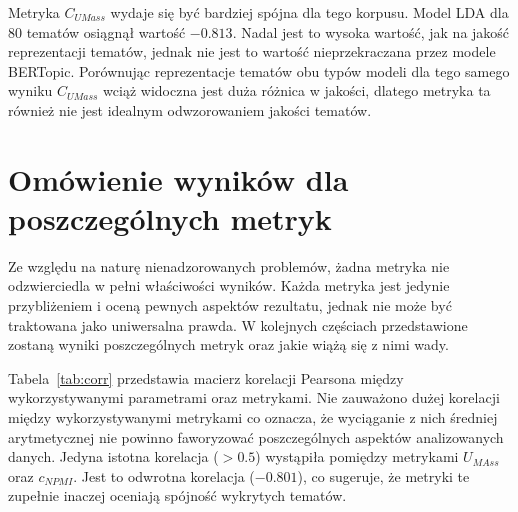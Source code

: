 	Metryka \(C_{UMass}\) wydaje się być bardziej spójna dla tego korpusu.
	Model LDA dla 80 tematów osiągnął wartość \(-0.813\).
	Nadal jest to wysoka wartość, jak na jakość reprezentacji tematów, jednak nie jest to wartość nieprzekraczana przez modele BERTopic.
	Porównując reprezentacje tematów obu typów modeli dla tego samego wyniku \(C_{UMass}\) wciąż widoczna jest duża różnica w jakości,
		dlatego metryka ta również nie jest idealnym odwzorowaniem jakości tematów.
	
\section{Omówienie wyników dla poszczególnych metryk}
	Ze względu na naturę nienadzorowanych problemów, żadna metryka nie odzwierciedla w pełni właściwości wyników.
	Każda metryka jest jedynie przybliżeniem i oceną pewnych aspektów rezultatu, jednak nie może być traktowana jako uniwersalna prawda.
	W kolejnych częściach przedstawione zostaną wyniki poszczególnych metryk oraz jakie wiążą się z nimi wady.

	Tabela~\ref{tab:corr} przedstawia macierz korelacji Pearsona między wykorzystywanymi parametrami oraz metrykami.
	Nie zauważono dużej korelacji między wykorzystywanymi metrykami co oznacza,
		że wyciąganie z nich średniej arytmetycznej nie powinno faworyzować poszczególnych aspektów analizowanych danych.
	Jedyna istotna korelacja (\(>0.5\)) wystąpiła pomiędzy metrykami \(U_{MAss}\) oraz \(c_{NPMI}\).
	Jest to odwrotna korelacja (\(-0.801\)), co sugeruje, że metryki te zupełnie inaczej oceniają spójność wykrytych tematów.

